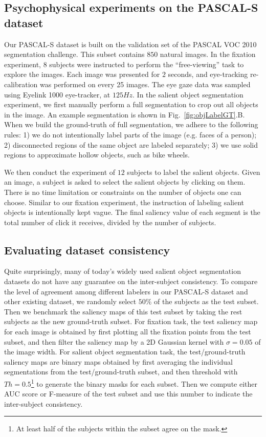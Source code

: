 \subsection{Psychophysical experiments on the PASCAL-S dataset}
Our PASCAL-S dataset is built on the validation set of the PASCAL VOC 2010 \cite{pascal-voc-2010} segmentation challenge.  This subset contains $850$ natural images.  In the fixation experiment, $8$ subjects were instructed to perform the ``free-viewing'' task to explore the images.  Each image was presented for $2$ seconds, and eye-tracking re-calibration was performed on every 25 images.  The eye gaze data was sampled using Eyelink 1000 eye-tracker, at $125Hz$.  In the salient object segmentation experiment, we first manually perform a full segmentation to crop out all objects in the image.  An example segmentation is shown in Fig.~\ref{fig:objLabelGT}.B.  When we build the ground-truth of full segmentation, we adhere to the following rules: 1) we do not intentionally label parts of the image (e.g. faces of a person); 2) disconnected regions of the same object are labeled separately; 3) we use solid regions to approximate hollow objects, such as bike wheels.

We then conduct the experiment of $12$ subjects to label the salient objects.  Given an image, a subject is asked to select the salient objects by clicking on them.  There is no time limitation or constraints on the number of objects one can choose.  Similar to our fixation experiment, the instruction of labeling salient objects is intentionally kept vague.  The final saliency value of each segment is the total number of click it receives, divided by the number of subjects.





\subsection{Evaluating dataset consistency}\label{sec:consistency}
Quite surprisingly, many of today's widely used salient object segmentation datasets do not have any guarantee on the inter-subject consistency.  To compare the level of agreement among different labelers in our PASCAL-S dataset and other existing dataset, we randomly select $50\%$ of the subjects as the test subset.  Then we benchmark the saliency maps of this test subset by taking the rest subjects as the new ground-truth subset. For fixation task, the test saliency map for each image is obtained by first plotting all the fixation points from the test subset, and then filter the saliency map by a 2D Gaussian kernel with $\sigma = 0.05$ of the image width. For salient object segmentation task, the test/ground-truth saliency maps are binary maps obtained by first averaging the individual segmentations from the test/ground-truth subset, and then threshold with $Th=0.5$\footnote{At least half of the subjects within the subset agree on the mask.} to generate the binary masks for each subset.  Then we compute either AUC score or F-measure of the test subset and use this number to indicate the inter-subject consistency.

